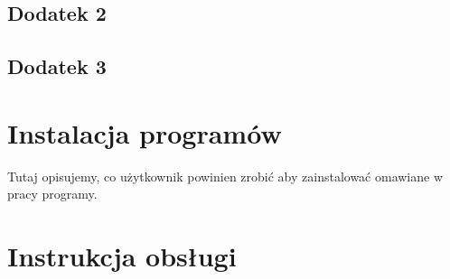 \subsection{Dodatek 2}
%
\subsection{Dodatek 3}
%

\section{Instalacja programów}

Tutaj opisujemy, co użytkownik powinien zrobić aby zainstalować
omawiane w pracy programy.

\section{Instrukcja obsługi}
